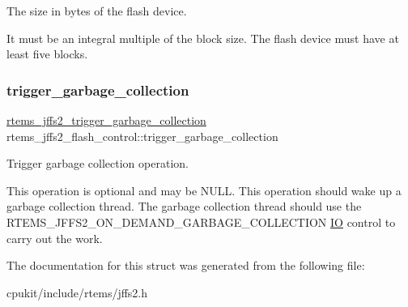 The size in bytes of the flash device. 

It must be an integral multiple of the block size. The flash device must have at least five blocks. \mbox{\label{structrtems__jffs2__flash__control_a17585e3c9fe032117f98c3b832fdcd09}} 
\subsubsection{\texorpdfstring{trigger\_garbage\_collection}{trigger\_garbage\_collection}}
{\footnotesize\ttfamily \mbox{\hyperlink{group__JFFS2_ga3abb194d2d804eb99116694f8204afaf}{rtems\+\_\+jffs2\+\_\+trigger\+\_\+garbage\+\_\+collection}} rtems\+\_\+jffs2\+\_\+flash\+\_\+control\+::trigger\+\_\+garbage\+\_\+collection}



Trigger garbage collection operation. 

This operation is optional and may be N\+U\+LL. This operation should wake up a garbage collection thread. The garbage collection thread should use the R\+T\+E\+M\+S\+\_\+\+J\+F\+F\+S2\+\_\+\+O\+N\+\_\+\+D\+E\+M\+A\+N\+D\+\_\+\+G\+A\+R\+B\+A\+G\+E\+\_\+\+C\+O\+L\+L\+E\+C\+T\+I\+ON \mbox{\hyperlink{structIO}{IO}} control to carry out the work. 

The documentation for this struct was generated from the following file\+:\begin{DoxyCompactItemize}
\item 
cpukit/include/rtems/jffs2.\+h\end{DoxyCompactItemize}
